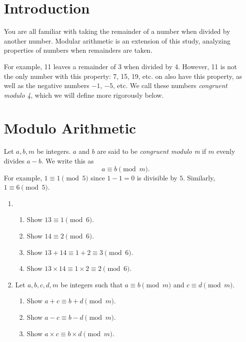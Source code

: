 \documentclass[11pt]{article}
\theoremstyle{definition}
\newcommand{\fdbox}[2]{\fbox{\sffamily\LARGE\vphantom y#1: \bfseries #2} \par\vspace{1em}} %
\begin{document}
\newcommand{\logo}{%
\begin{minipage}[b]{22em}
\centering\noindent
\\[0.5em]
\begin{minipage}[t][4em][t]{12em} \centering
{\huge \bfseries ${\bf 26^{\text{th}}}$ TJIMO } \\
\textsc{\large Alexandria, Virginia}
\end{minipage}
\end{minipage}
\vspace*{-0.05em}
}
\newcommand{\sevenpoints}{Time limit: 30 minutes.}
\newcommand{\righthead}{\fdbox{Round}{Practice Power}}



\section{Introduction}

You are all familiar with taking the remainder of a number
when divided by another number. Modular arithmetic is an
extension of this study, analyzing properties of numbers
when remainders are taken.

For example, 11 leaves a remainder
of 3 when divided by 4. However, 11 is not the only number
with this property: 7, 15, 19, etc. on also have this property,
as well as the negative numbers $-1$, $-5$, etc.
We call these numbers \textit{congruent modulo 4}, which we
will define more rigorously below.

\section{Modulo Arithmetic}
Let $a,b,m$ be integers. $a$ and $b$ are said to be \textit{congruent modulo m}
if $m$ evenly divides $a - b$. We write this as
\[a \equiv b \pmod{m}.\]
For example, $1 \equiv 1 \pmod{5}$ since
$1 - 1 = 0$ is divisible by $5$. Similarly, $1 \equiv 6 \pmod{5}$.

\begin{enumerate} \addtocounter{enumi}{\value{problem_count}}
\item \addtocounter{problem_count}{1}
\begin{enumerate}
\item Show $13 \equiv 1 \pmod{6}$.
\item Show $14 \equiv 2 \pmod{6}$.
\item Show $13 + 14 \equiv 1 + 2 \equiv 3 \pmod{6}$.
\item Show $13 \times 14 \equiv 1 \times 2 \equiv 2 \pmod{6}$.
\end{enumerate}
\item \addtocounter{problem_count}{1}
Let $a,b,c,d,m$ be integers such that $a \equiv b \pmod{m}$ and $c \equiv d \pmod{m}$.
\begin{enumerate}
\item Show $a + c \equiv b + d \pmod{m}$.
\item Show $a - c \equiv b - d \pmod{m}$.
\item Show $a \times c \equiv b \times d \pmod{m}$.
\end{enumerate}
\end{enumerate}
\end{document}
